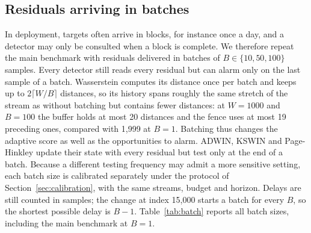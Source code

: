 \documentclass[preprint,12pt]{elsarticle}
\begin{document}
\subsection{Residuals arriving in batches}
\label{sec:batches}
In deployment, targets often arrive in blocks, for instance once a day, and a detector may only be consulted when a block is complete. We therefore repeat the main benchmark with residuals delivered in batches of $B\in\{10,50,100\}$ samples. Every detector still reads every residual but can alarm only on the last sample of a batch. Wasserstein computes its distance once per batch and keeps up to $2\lceil W/B\rceil$ distances, so its history spans roughly the same stretch of the stream as without batching but contains fewer distances: at $W=1000$ and $B=100$ the buffer holds at most 20 distances and the fence uses at most 19 preceding ones, compared with 1,999 at $B=1$. Batching thus changes the adaptive score as well as the opportunities to alarm. ADWIN, KSWIN and Page-Hinkley update their state with every residual but test only at the end of a batch. Because a different testing frequency may admit a more sensitive setting, each batch size is calibrated separately under the protocol of Section~\ref{sec:calibration}, with the same streams, budget and horizon. Delays are still counted in samples; the change at index 15,000 starts a batch for every $B$, so the shortest possible delay is $B-1$. Table~\ref{tab:batch} reports all batch sizes, including the main benchmark at $B=1$.
\end{document}
